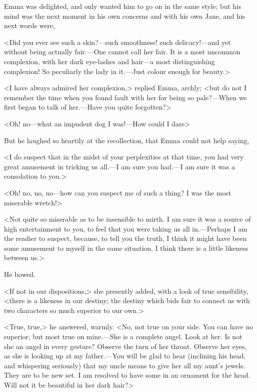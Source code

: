Emma was delighted, and only wanted him to go on in the same style; but his mind was the next moment in his own concerns and with his own Jane, and his next words were,

<Did you ever see such a skin?—such smoothness! such delicacy!—and yet without being actually fair.—One cannot call her fair. It is a most uncommon complexion, with her dark eye-lashes and hair—a most distinguishing complexion! So peculiarly the lady in it.—Just colour enough for beauty.>

<I have always admired her complexion,> replied Emma, archly; <but do not I remember the time when you found fault with her for being so pale?—When we first began to talk of her.—Have you quite forgotten?>

<Oh! no—what an impudent dog I was!—How could I dare\longdash>

But he laughed so heartily at the recollection, that Emma could not help saying,

<I do suspect that in the midst of your perplexities at that time, you had very great amusement in tricking us all.—I am sure you had.—I am sure it was a consolation to you.>

<Oh! no, no, no—how can you suspect me of such a thing? I was the most miserable wretch!>

<Not quite so miserable as to be insensible to mirth. I am sure it was a source of high entertainment to you, to feel that you were taking us all in.—Perhaps I am the readier to suspect, because, to tell you the truth, I think it might have been some amusement to myself in the same situation. I think there is a little likeness between us.>

He bowed.

<If not in our dispositions,> she presently added, with a look of true sensibility, <there is a likeness in our destiny; the destiny which bids fair to connect us with two characters so much superior to our own.>

<True, true,> he answered, warmly. <No, not true on your side. You can have no superior, but most true on mine.—She is a complete angel. Look at her. Is not she an angel in every gesture? Observe the turn of her throat. Observe her eyes, as she is looking up at my father.—You will be glad to hear (inclining his head, and whispering seriously) that my uncle means to give her all my aunt's jewels. They are to be new set. I am resolved to have some in an ornament for the head. Will not it be beautiful in her dark hair?>

